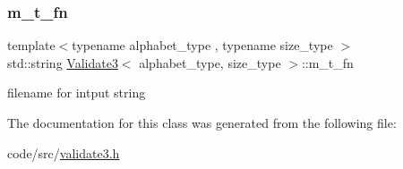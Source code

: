 \mbox{\label{class_validate3_a6f754bab729d30bd1d600bee9b68c4c4}} 
\subsubsection{\texorpdfstring{m\+\_\+t\+\_\+fn}{m\_t\_fn}}
{\footnotesize\ttfamily template$<$typename alphabet\+\_\+type , typename size\+\_\+type $>$ \\
std\+::string \hyperlink{class_validate3}{Validate3}$<$ alphabet\+\_\+type, size\+\_\+type $>$\+::m\+\_\+t\+\_\+fn\hspace{0.3cm}{\ttfamily [private]}}



filename for intput string 



The documentation for this class was generated from the following file\+:\begin{DoxyCompactItemize}
\item 
code/src/\hyperlink{validate3_8h}{validate3.\+h}\end{DoxyCompactItemize}
